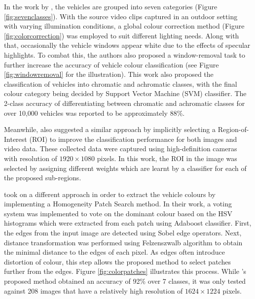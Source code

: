 In the work by
, the vehicles are grouped into seven categories (Figure \ref{fig:sevenclasses}). With the source video clips captured in an outdoor setting with varying illumination conditions, a global colour correction method (Figure \ref{fig:colorcorrection}) was employed to suit different lighting needs. Along with that, occasionally the vehicle windows appear white due to the effects of specular highlights. To combat this, the authors also proposed a window-removal task to further increase the accuracy of vehicle colour classification (see Figure \ref{fig:windowremoval} for the illustration). This work also proposed the classification of vehicles into chromatic and achromatic classes, with the final colour category being decided by Support Vector Machine (SVM) classifier. The 2-class accuracy of differentiating between chromatic and achromatic classes for over 10,000 vehicles was reported to be approximately 88\%.

Meanwhile,  also
suggested a similar approach by implicitly selecting a Region-of-Interest (ROI) to improve the classification performance for both images and video data. These collected data were captured using high-definition cameras with resolution of $1920 \times 1080$ pixels. In this work, the ROI in the image was selected by assigning different weights which are learnt by a classifier for each of the proposed sub-regions.

 took on a different approach in order to extract
the vehicle colours by implementing a Homogeneity Patch Search method. In their work, a voting system was implemented to vote on the dominant colour based on the HSV histograms which were extracted from each patch using Adaboost classifier. First, the edges from the input image are detected using Sobel edge operators. Next, distance transformation was performed using Felzenszwalb algorithm to obtain the minimal distance to the edges of each pixel. As edges often introduce distortion of colour, this step allows the proposed method to select patches further from the edges. Figure \ref{fig:colorpatches} illustrates this
process. While 's proposed method obtained an
accuracy of 92\% over 7 classes, it was only tested against 208 images that have
a relatively high resolution of $1624 \times 1224$ pixels.

